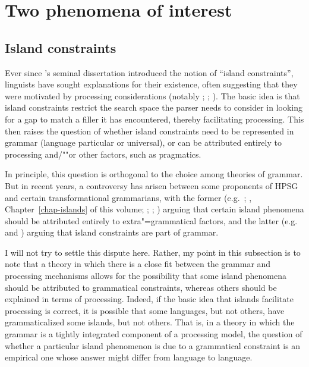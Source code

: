 \documentclass[output=paper,biblatex,babelshorthands,newtxmath,draftmode,colorlinks,citecolor=brown]{langscibook}
\begin{document}
\section{Two phenomena of interest}
\label{sec-phenomena-processing}

\subsection{Island constraints}

\largerpage
Ever since \citeauthor{Ross67}'s seminal dissertation \citeyearpar{Ross67} introduced the notion of
``island constraints'', linguists have sought explanations for their existence, often
suggesting that they were motivated by processing considerations (notably \citealt{Grosu72-u};
\citealt{Fodor83}; \citealt{Deane91}).  The basic idea is that island constraints restrict the
search space the parser needs to consider in looking for a gap to match a filler it has encountered,
thereby facilitating processing.  This then raises the question of whether island constraints need
to be represented in grammar (language particular or universal), or can be attributed entirely to
processing and/""or other factors, such as pragmatics.

In principle, this question is orthogonal to the choice among theories of grammar.  But in recent
years, a controversy has arisen between some proponents of HPSG and certain transformational
grammarians, with the former (e.g.\ \citealp{Chaves2012}; \citeyear{chapters/islands}, Chapter~\ref{chap-islands} of this volume; \citealt{HofmeisterSag2010};
\citealt*{HofmeisterEtal2013}; ) arguing that certain island phenomena should be attributed entirely
to extra"=grammatical factors, and the latter (e.g.\ \citealt{Phillips2013} and
\citealt{SWP2012a-u}) arguing that island constraints are part of grammar. 

I will not try to settle this dispute here.  Rather, my point in this subsection is to note that a
theory in which there is a close fit between the grammar and processing mechanisms allows for the
possibility that some island phenomena should be attributed to grammatical constraints, whereas
others should be explained in terms of processing.  Indeed, if the basic idea that islands
facilitate processing is correct, it is possible that some languages, but not others, have
grammaticalized some islands, but not others.  That is, in a theory in which the grammar is a
tightly integrated component of a processing model, the question of whether a particular island
phenomenon is due to a grammatical constraint is an empirical one whose answer might differ from
language to language.  
\end{document}
